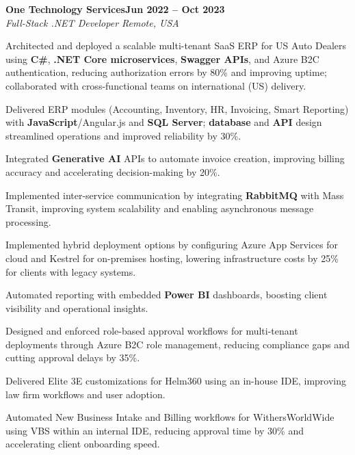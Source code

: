 \documentclass[letterpaper,10pt]{article}
\newcommand{\headingBf}[2]{
  \hspace{10pt}\textbf{#1}\hfill\textbf{#2}\\
}
\newcommand{\headingIt}[2]{
  \hspace{10pt}\textit{#1}\hfill\textit{#2}\\
}
\newenvironment{resume_list}{
  \vspace{-7pt}
  \begin{itemize}[itemsep=-2px, parsep=1pt, leftmargin=30pt]
}{
  \end{itemize}
}
\begin{document}
\headingBf{One Technology Services}{Jun 2022 -- Oct 2023}
\headingIt{Full-Stack .NET Developer \hfill Remote, USA}{}
\begin{resume_list}
    \item Architected and deployed a scalable multi-tenant SaaS ERP for US Auto Dealers using \textbf{C\#}, \textbf{.NET Core microservices}, \textbf{Swagger APIs}, and Azure B2C authentication, reducing authorization errors by 80\% and improving uptime; collaborated with cross-functional teams on international (US) delivery.
    \item Delivered ERP modules (Accounting, Inventory, HR, Invoicing, Smart Reporting) with \textbf{JavaScript}/Angular.js and \textbf{SQL Server}; \textbf{database} and \textbf{API} design streamlined operations and improved reliability by 30\%.
    \item Integrated \textbf{Generative AI} APIs to automate invoice creation, improving billing accuracy and accelerating decision-making by 20\%.
    \item Implemented inter-service communication by integrating \textbf{RabbitMQ} with Mass Transit, improving system scalability and enabling asynchronous message processing.
    \item Implemented hybrid deployment options by configuring Azure App Services for cloud and Kestrel for on-premises hosting, lowering infrastructure costs by 25\% for clients with legacy systems.
    \item Automated reporting with embedded \textbf{Power BI} dashboards, boosting client visibility and operational insights.
    \item Designed and enforced role-based approval workflows for multi-tenant deployments through Azure B2C role management, reducing compliance gaps and cutting approval delays by 35\%.
    \item Delivered Elite 3E customizations for Helm360 using an in-house IDE, improving law firm workflows and user adoption.
    \item Automated New Business Intake and Billing workflows for WithersWorldWide using VBS within an internal IDE, reducing approval time by 30\% and accelerating client onboarding speed.
\end{resume_list}
\end{document}
